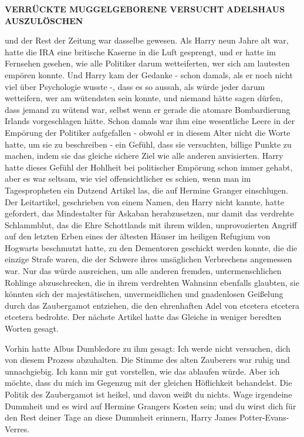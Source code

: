 \textbf{\glqq{}VERRÜCKTE MUGGELGEBORENE
VERSUCHT}    \textbf{ADELSHAUS
AUSZULÖSCHEN\grqq{}}

und der Rest der Zeitung war dasselbe gewesen. Als Harry neun Jahre alt war,
hatte die IRA eine britische Kaserne in die Luft gesprengt, und er hatte im
Fernsehen gesehen, wie alle Politiker darum wetteiferten, wer sich am lautesten
empören konnte. Und Harry kam der Gedanke - schon damals, als er noch nicht viel
über Psychologie wusste -, dass es so aussah, als würde jeder darum wetteifern,
wer am wütendsten sein konnte, und niemand hätte sagen dürfen, dass jemand zu
wütend war, selbst wenn er gerade die atomare Bombardierung Irlands
vorgeschlagen hätte. Schon damals war ihm eine wesentliche Leere in der Empörung
der Politiker aufgefallen - obwohl er in diesem Alter nicht die Worte hatte, um
sie zu beschreiben - ein Gefühl, dass sie versuchten, billige Punkte zu machen,
indem sie das gleiche sichere Ziel wie alle anderen anvisierten. Harry hatte
dieses Gefühl der Hohlheit bei politischer Empörung schon immer gehabt, aber es
war seltsam, wie viel offensichtlicher es schien, wenn man im Tagespropheten ein
Dutzend Artikel las, die auf Hermine Granger einschlugen. Der Leitartikel,
geschrieben von einem Namen, den Harry nicht kannte, hatte gefordert, das
Mindestalter für Askaban herabzusetzen, nur damit das verdrehte Schlammblut, das
die Ehre Schottlands mit ihrem wilden, unprovozierten Angriff auf den letzten
Erben eines der ältesten Häuser im heiligen Refugium von Hogwarts beschmutzt
hatte, zu den Dementoren geschickt werden konnte, die die einzige Strafe waren,
die der Schwere ihres unsäglichen Verbrechens angemessen war. Nur das würde
ausreichen, um alle anderen fremden, untermenschlichen Rohlinge abzuschrecken,
die in ihrem verdrehten Wahnsinn ebenfalls glaubten, sie könnten sich der
majestätischen, unvermeidlichen und gnadenlosen Geißelung durch das Zaubergamot
entziehen, die den ehrenhaften Adel von etcetera etcetera etcetera bedrohte. Der
nächste Artikel hatte das Gleiche in weniger beredten Worten gesagt.

Vorhin hatte Albus Dumbledore zu ihm gesagt: \glqq{}Ich werde nicht versuchen,
dich von diesem Prozess abzuhalten.\grqq{} Die Stimme des alten Zauberers war
ruhig und unnachgiebig. \glqq{}Ich kann mir gut vorstellen, wie das ablaufen
würde. Aber ich möchte, dass du mich im Gegenzug mit der gleichen Höflichkeit
behandelst. Die Politik des Zaubergamot ist heikel, und davon weißt du nichts.
Wage irgendeine Dummheit und es wird auf Hermine Grangers Kosten sein; und du
wirst dich für den Rest deiner Tage an diese Dummheit erinnern, Harry James
Potter-Evans-Verres.\grqq{}

